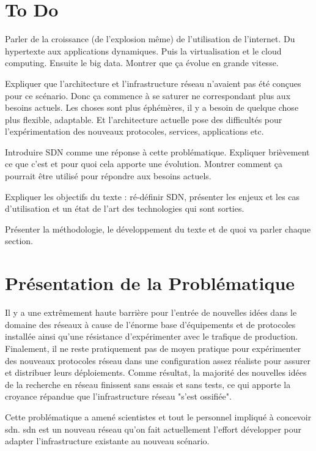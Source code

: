 
\section{To Do}
Parler de la croissance (de l'explosion même) de l'utilisation de l'internet. Du hypertexte aux applications dynamiques. Puis la virtualisation et le cloud computing. Ensuite le big data. Montrer que ça évolue en grande vitesse.
\par
Expliquer que l'architecture et l'infrastructure réseau n'avaient pas été conçues pour ce scénario. Donc ça commence à se saturer ne correspondant plus aux besoins actuels. Les choses sont plus éphémères, il y a besoin de quelque chose plus flexible, adaptable. Et l'architecture actuelle pose des difficultés pour l'expérimentation des nouveaux protocoles, services, applications etc. 
\par
Introduire SDN comme une réponse à cette problématique. Expliquer brièvement ce que c'est et pour quoi cela apporte une évolution. Montrer comment ça pourrait être utilisé pour répondre aux besoins actuels.
\par
Expliquer les objectifs du texte : ré-définir SDN, présenter les enjeux et les cas d'utilisation et un état de l'art des technologies qui sont sorties.
\par
Présenter la méthodologie, le développement du texte et de quoi va parler chaque section. 
 

\section{Présentation de la Problématique}

Il y a une extrêmement haute barrière pour l'entrée de nouvelles idées dans le domaine des réseaux à cause de l'énorme base d'équipements et de protocoles installée ainsi qu'une résistance d'expérimenter avec le trafique de production. Finalement, il ne reste pratiquement pas de moyen pratique pour expérimenter des nouveaux protocoles réseau dans une configuration assez réaliste pour assurer et distribuer leurs déploiements. Comme résultat, la majorité des nouvelles idées de la recherche en réseau finissent sans essais et sans tests, ce qui apporte la croyance répandue que l'infrastructure réseau "s'est ossifiée". \cite{OpenFlowStanford} \par
Cette problématique a amené scientistes et tout le personnel impliqué à concevoir \gls{sdn}. \gls{sdn} est un nouveau  réseau qu'on fait actuellement l'effort développer pour adapter l'infrastructure existante au nouveau scénario.